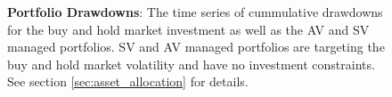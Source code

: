 \clearpage
\begin{figure}[!htb]
	\caption{{\bf Portfolio Drawdowns}: The time series of cummulative drawdowns for the buy and hold market investment as well as the AV and SV managed portfolios. SV and AV managed portfolios are targeting the buy and hold market volatility and have no investment constraints. See section \ref{sec:asset_allocation} for details.} \label{fig:drawdowns}
	\vspace{-4mm}
	
\end{figure}